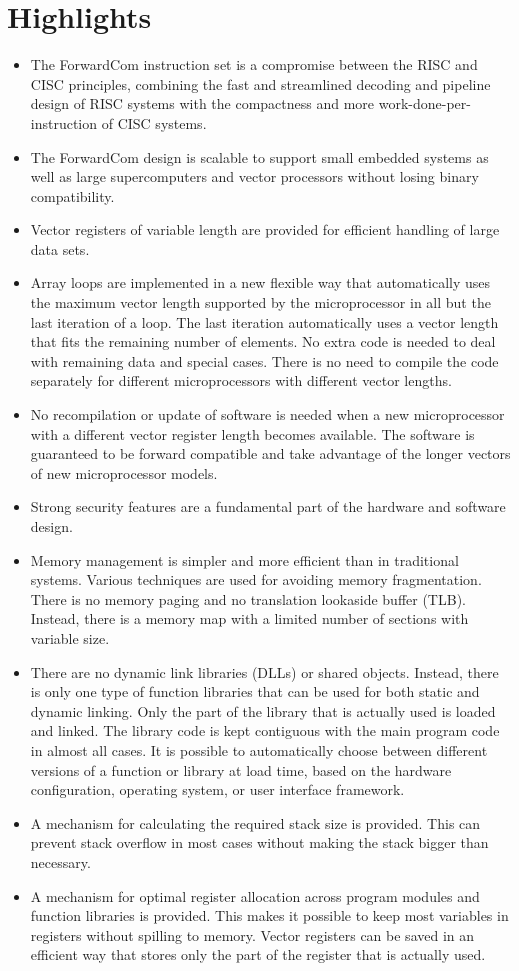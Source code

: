 \documentclass[forwardcom.tex]{subfiles}
\begin{document}
\section{Highlights}
\begin{itemize}
\item The ForwardCom instruction set is a compromise between the RISC and CISC principles, combining the fast and streamlined decoding and pipeline design of RISC systems with the compactness and more work-done-per-instruction of CISC systems.
\item The ForwardCom design is scalable to support small embedded systems as well as large supercomputers and vector processors without losing binary compatibility.
\item Vector registers of variable length are provided for efficient handling of large data sets.
\item Array loops are implemented  in a new flexible way that automatically uses the maximum vector length supported by the microprocessor in all but the last iteration of a loop. The last iteration automatically uses a vector length that fits the remaining number of elements. No extra code is needed to deal with remaining data and special cases. There is no need to compile the code separately for different microprocessors with different vector lengths.
\item No recompilation or update of software is needed when a new microprocessor with a different vector register length becomes available. The software is guaranteed to be forward compatible and take advantage of the longer vectors
of new microprocessor models.
\item Strong security features are a fundamental part of the hardware and software design.
\item Memory management is simpler and more efficient than in traditional systems. 
Various techniques are used for avoiding memory 
fragmentation. There is no memory paging and no translation lookaside buffer (TLB). Instead, there is a memory map with a limited number of sections with variable size.
\item There are no dynamic link libraries (DLLs) or shared objects. Instead, there is only one type of function libraries 
that can be used for both static and dynamic linking. Only the part of the library that is actually used is loaded and linked. The library code is kept contiguous with the main program code in almost all cases. It is possible to automatically choose between different versions of a function or library at load time, based on the hardware configuration, operating system, or user interface framework.
\item A mechanism for calculating the required stack size is provided. This can prevent stack overflow in most cases without making the stack bigger than necessary.
\item A mechanism for optimal register allocation across program modules and function libraries is provided. This makes it possible to keep most variables in registers without spilling to memory. Vector registers can be saved in an efficient way that stores only the part of the register that is actually used.
\end{itemize}
\end{document}
